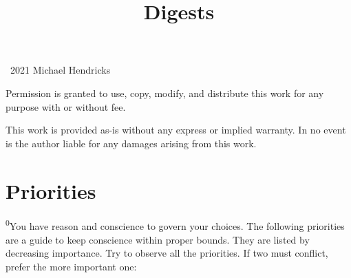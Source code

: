 \documentclass[openany,12pt,english]{book}
\title{Digests}
\author{}
\date{}
\newenvironment{para}{\par\pretolerance=100\tolerance=200\setlength{\emergencystretch}{0.6em}\relax}{\par}
\begin{document}
\maketitle

{
\thispagestyle{empty}
\vspace*{\fill}
\begin{changemargin}{.8in}{.8in}
\begin{center}
\textcopyright{}~2021 Michael Hendricks

\vspace{0.5\baselineskip}

Permission is granted to use, copy, modify, and distribute
this work for any purpose with or without fee.

\vspace{0.5\baselineskip}

This work is provided as-is without any express or implied
warranty. In no event is the author liable for any damages
arising from this work.
\end{center}
\end{changemargin}
}
\clearpage{}

\tableofcontents
\clearpage{}

\markboth{}{}


\section*{Priorities}
\begin{para}
    \textsuperscript{0}\thinspace{}You have rea\-son and con\-science to gov\-ern your choices. The fol\-low\-ing priorities are a guide to keep con\-science with\-in prop\-er bounds. They are list\-ed by de\-creas\-ing im\-por\-tance. Try to ob\-serve all the priorities. If two must con\-flict, pre\-fer the more im\-por\-tant one:
\end{para}
\end{document}
